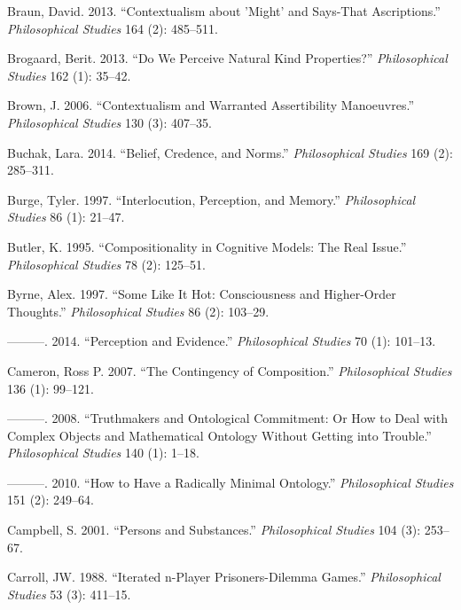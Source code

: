 \documentclass[
  10pt,
  letterpaper,
  DIV=11,
  numbers=noendperiod,
  twoside]{scrartcl}
\newlength{\cslhangindent}
\newenvironment{CSLReferences}[2] %
 {\begin{list}{}{%
  \setlength{\itemindent}{0pt}
  \setlength{\leftmargin}{0pt}
  \setlength{\parsep}{0pt}
  \ifodd #1
   \setlength{\leftmargin}{\cslhangindent}
   \setlength{\itemindent}{-1\cslhangindent}
  \fi
  \setlength{\itemsep}{#2\baselineskip}}}
 {\end{list}}
\begin{document}
\begin{CSLReferences}{1}{0}
Braun, David. 2013. {``Contextualism about 'Might' and Says-That
Ascriptions.''} \emph{Philosophical Studies} 164 (2): 485--511.

Brogaard, Berit. 2013. {``Do We Perceive Natural Kind Properties?''}
\emph{Philosophical Studies} 162 (1): 35--42.

Brown, J. 2006. {``Contextualism and Warranted Assertibility
Manoeuvres.''} \emph{Philosophical Studies} 130 (3): 407--35.

Buchak, Lara. 2014. {``Belief, Credence, and Norms.''}
\emph{Philosophical Studies} 169 (2): 285--311.

Burge, Tyler. 1997. {``Interlocution, Perception, and Memory.''}
\emph{Philosophical Studies} 86 (1): 21--47.

Butler, K. 1995. {``Compositionality in Cognitive Models: The Real
Issue.''} \emph{Philosophical Studies} 78 (2): 125--51.

Byrne, Alex. 1997. {``Some Like It Hot: Consciousness and Higher-Order
Thoughts.''} \emph{Philosophical Studies} 86 (2): 103--29.

---------. 2014. {``Perception and Evidence.''} \emph{Philosophical
Studies} 70 (1): 101--13.

Cameron, Ross P. 2007. {``The Contingency of Composition.''}
\emph{Philosophical Studies} 136 (1): 99--121.

---------. 2008. {``Truthmakers and Ontological Commitment: Or How to
Deal with Complex Objects and Mathematical Ontology Without Getting into
Trouble.''} \emph{Philosophical Studies} 140 (1): 1--18.

---------. 2010. {``How to Have a Radically Minimal Ontology.''}
\emph{Philosophical Studies} 151 (2): 249--64.

Campbell, S. 2001. {``Persons and Substances.''} \emph{Philosophical
Studies} 104 (3): 253--67.

Carroll, JW. 1988. {``Iterated n-Player Prisoners-Dilemma Games.''}
\emph{Philosophical Studies} 53 (3): 411--15.


\end{CSLReferences}
\end{document}
